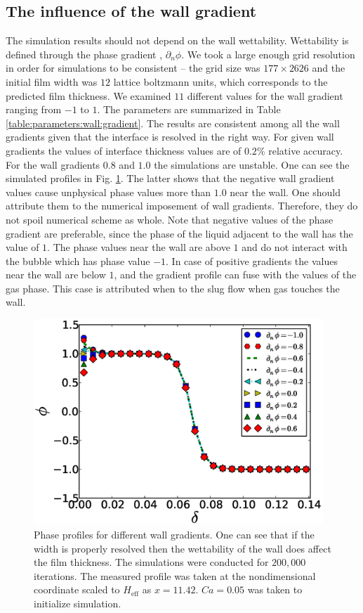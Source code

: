\documentclass{article}
\begin{document}
\subsection{The influence of the wall gradient}
The simulation results should not depend on the wall wettability. Wettability is defined
through the phase gradient \cite{pooley-contact}, $\partial_n \phi$.  We took a large
enough grid resolution in order for simulations to be consistent -- the grid size was
$177 \times 2626$ and the initial film width was
$12$ lattice boltzmann units, which corresponds to the predicted film thickness.
We examined $11$ different values for the wall
gradient ranging from $-1$ to $1$. The parameters are summarized in Table
\ref{table:parameters:wall:gradient}. The results are consistent among all the
wall gradients given that the interface is resolved in the right way. For 
given wall gradients the values of interface thickness values are of $0.2\%$ relative accuracy.  For
the wall gradients $0.8$
and $1.0$ the
simulations are unstable. One can see the simulated profiles in Fig.
\ref{fig:gradients:profiles}. The latter shows that the negative wall gradient values cause 
unphysical phase values more than $1.0$ near the wall. One should attribute them to the numerical
imposement of wall gradients. Therefore, they do not spoil numerical scheme as whole. Note that
negative values of the phase gradient are
preferable, since the phase of the liquid adjacent to the wall has the value of $1$.
The phase values near the wall are above $1$ and do not interact
with the bubble which has phase value $-1$.  In case of positive
gradients the values near the wall are below $1$, and the gradient profile can
fuse with the values of the gas phase. This case is attributed when to the slug flow when gas
touches the wall.
\begin{figure}
\includegraphics[width=0.97\textwidth]{Figures/Wall/phase_grad_profiles.eps}
\caption{Phase profiles for different wall gradients. One can see that if the width
is properly resolved then the wettability of the wall does affect the film thickness. The
simulations were conducted for $200,000$ iterations. The measured profile was taken at the
nondimensional coordinate scaled to $H_{\mathrm{eff}}$ as $x=11.42$. $Ca=0.05$ was taken to
initialize simulation.
\label{fig:gradients:profiles}
}
\end{figure}
\end{document}
